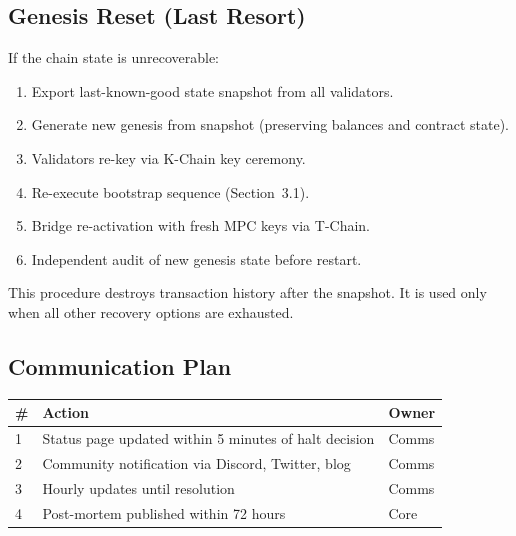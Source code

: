 \subsection{Genesis Reset (Last Resort)}

If the chain state is unrecoverable:

\begin{enumerate}[nosep]
  \item Export last-known-good state snapshot from all validators.
  \item Generate new genesis from snapshot (preserving balances and contract state).
  \item Validators re-key via K-Chain key ceremony.
  \item Re-execute bootstrap sequence (Section~3.1).
  \item Bridge re-activation with fresh MPC keys via T-Chain.
  \item Independent audit of new genesis state before restart.
\end{enumerate}

\noindent This procedure destroys transaction history after the snapshot.
It is used only when all other recovery options are exhausted.

\subsection{Communication Plan}

\begin{tabularx}{\textwidth}{@{}l X l@{}}
\toprule
\textbf{\#} & \textbf{Action} & \textbf{Owner} \\
\midrule
1 & Status page updated within 5 minutes of halt decision         & Comms  \\
2 & Community notification via Discord, Twitter, blog              & Comms  \\
3 & Hourly updates until resolution                                & Comms  \\
4 & Post-mortem published within 72 hours                          & Core   \\
\bottomrule
\end{tabularx}

